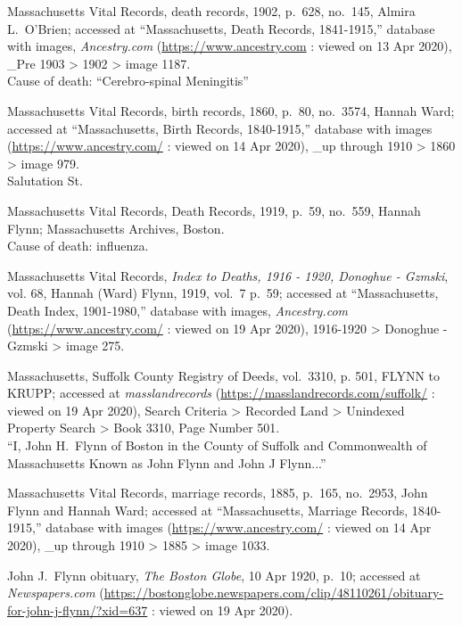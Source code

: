 \begin{thebibliography}{999}
	Massachusetts Vital Records, death records, 1902, p.\ 628, no.\ 145, Almira L.\ O'Brien; accessed at ``Massachusetts, Death Records, 1841-1915,'' database with images, \textit{Ancestry.com} (\url{https://www.ancestry.com} : viewed on 13 Apr 2020), \_Pre 1903 > 1902 > image 1187.\\
	Cause of death: ``Cerebro-spinal Meningitis''
	
	Massachusetts Vital Records, birth records, 1860, p.\ 80, no.\ 3574, Hannah Ward; accessed at ``Massachusetts, Birth Records, 1840-1915,'' database with images (\url{https://www.ancestry.com/} : viewed on 14 Apr 2020), \_up through 1910 > 1860 > image 979.\\
	Salutation St.
	
	Massachusetts Vital Records, Death Records, 1919, p.\ 59, no.\ 559, Hannah Flynn; Massachusetts Archives, Boston.\\
	Cause of death: influenza.
	
	Massachusetts Vital Records, \textit{Index to Deaths, 1916 - 1920, Donoghue - Gzmski}, vol. 68, Hannah (Ward) Flynn, 1919, vol.\ 7 p.\ 59; accessed at ``Massachusetts, Death Index, 1901-1980,'' database with images, \textit{Ancestry.com} (\url{https://www.ancestry.com/} : viewed on 19 Apr 2020), 1916-1920 > Donoghue - Gzmski > image 275.
	
	Massachusetts, Suffolk County Registry of Deeds, vol.\ 3310, p. 501, FLYNN to KRUPP; accessed at \textit{masslandrecords} (\url{https://masslandrecords.com/suffolk/} : viewed on 19 Apr 2020), Search Criteria >  Recorded Land > Unindexed Property Search > Book 3310, Page Number 501.\\
	``I, John H.\ Flynn of Boston in the County of Suffolk and Commonwealth of Massachusetts Known as John Flynn and John J Flynn...''
	
	Massachusetts Vital Records, marriage records, 1885, p.\ 165, no.\ 2953, John Flynn and Hannah Ward; accessed at ``Massachusetts, Marriage Records, 1840-1915,'' database with images (\url{https://www.ancestry.com/} : viewed on 14 Apr 2020), \_up through 1910 > 1885 > image 1033.
		
	John J.\ Flynn obituary, \textit{The Boston Globe}, 10 Apr 1920, p.\ 10; accessed at \textit{Newspapers.com} (\url{https://bostonglobe.newspapers.com/clip/48110261/obituary-for-john-j-flynn/?xid=637} : viewed on 19 Apr 2020).
	

\end{thebibliography}
